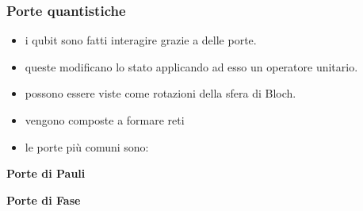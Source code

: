 \documentclass[aspectratio=169]{beamer}
\begin{document}
\begin{frame}
	\frametitle{Porte quantistiche}

	\begin{itemize}
		\item i qubit sono fatti interagire grazie a delle porte.
		      \pause
		\item queste modificano lo stato applicando ad esso un operatore unitario.
		      \pause
		\item possono essere viste come rotazioni della sfera di Bloch.
		      \pause
		\item vengono composte a formare reti
		      \pause
		\item le porte più comuni sono:
	\end{itemize}

	\vspace{10pt}

	\begin{minipage}{0.24\textwidth}
		\begin{center}
			\textbf{Porte di Pauli}\\
			\vspace{10pt}
			\begin{quantikz}
			\end{quantikz}
			\begin{quantikz}
				\gate{Y}
			\end{quantikz}
			\begin{quantikz}
				\gate{Z}
			\end{quantikz}
		\end{center}

	\end{minipage}
	\begin{minipage}{0.24\textwidth}
		\begin{center}
			\textbf{Porte di Fase}\\
			\vspace{10pt}
			\begin{quantikz}
				\gate{S}
			\end{quantikz}
			\begin{quantikz}
				\gate{T}
			\end{quantikz}
			\begin{quantikz}
				\gate{P}
			\end{quantikz}
		\end{center}


\end{minipage}
\end{frame}
\end{document}
